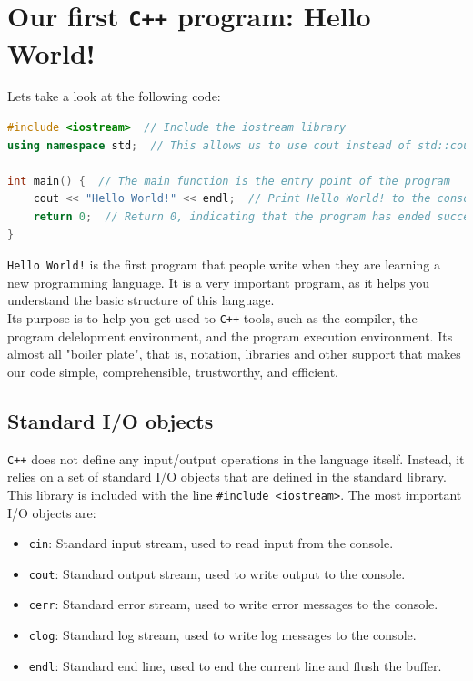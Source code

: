 \section{Our first \texttt{C++} program: Hello World!}

Lets take a look at the following code:


\begin{lstlisting}[language=C++]
#include <iostream>  // Include the iostream library
using namespace std;  // This allows us to use cout instead of std::cout

int main() {  // The main function is the entry point of the program
    cout << "Hello World!" << endl;  // Print Hello World! to the console
    return 0;  // Return 0, indicating that the program has ended successfully
}
\end{lstlisting}

\texttt{Hello World!} is the first program that people write when they are learning a 
new programming language. It is a very important program, as it helps you understand the 
basic structure of this language.\\

Its purpose is to help you get used to \texttt{C++} tools, such as the compiler, the 
program delelopment environment, and the program execution environment. Its almost all 
"boiler plate", that is, notation, libraries and other support that makes our code simple, 
comprehensible, trustworthy, and efficient.\\

\subsection{Standard I/O objects}

\texttt{C++} does not define any input/output operations in the language itself. Instead,
it relies on a set of standard I/O objects that are defined in the standard library. This
library is included with the line \texttt{\#include <iostream>}. The most important I/O
objects are:

\begin{itemize}
    \item \texttt{cin}: Standard input stream, used to read input from the console.
    \item \texttt{cout}: Standard output stream, used to write output to the console.
    \item \texttt{cerr}: Standard error stream, used to write error messages to the console.
    \item \texttt{clog}: Standard log stream, used to write log messages to the console.
    \item \texttt{endl}: Standard end line, used to end the current line and flush the buffer.
\end{itemize}

